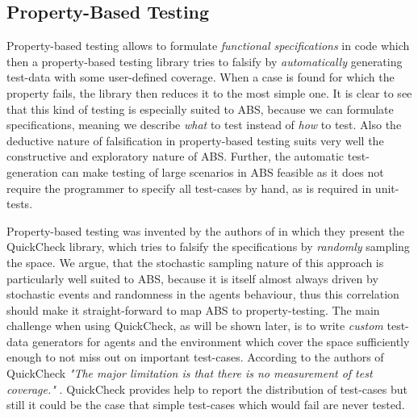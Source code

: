 \subsection{Property-Based Testing}
Property-based testing allows to formulate \textit{functional specifications} in code which then a property-based testing library tries to falsify by \textit{automatically} generating test-data with some user-defined coverage. When a case is found for which the property fails, the library then reduces it to the most simple one. It is clear to see that this kind of testing is especially suited to ABS, because we can formulate specifications, meaning we describe \textit{what} to test instead of \textit{how} to test. Also the deductive nature of falsification in property-based testing suits very well the constructive and exploratory nature of ABS. Further, the automatic test-generation can make testing of large scenarios in ABS feasible as it does not require the programmer to specify all test-cases by hand, as is required in unit-tests.

Property-based testing was invented by the authors of \cite{claessen_quickcheck:_2000, claessen_testing_2002} in which they present the QuickCheck library, which tries to falsify the specifications by \textit{randomly} sampling the space. We argue, that the stochastic sampling nature of this approach is particularly well suited to ABS, because it is itself almost always driven by stochastic events and randomness in the agents behaviour, thus this correlation should make it straight-forward to map ABS to property-testing. The main challenge when using QuickCheck, as will be shown later, is to write \textit{custom} test-data generators for agents and the environment which cover the space sufficiently enough to not miss out on important test-cases. According to the authors of QuickCheck \textit{"The major limitation is that there is no measurement of test coverage."} \cite{claessen_quickcheck:_2000}. QuickCheck provides help to report the distribution of test-cases but still it could be the case that simple test-cases which would fail are never tested.

